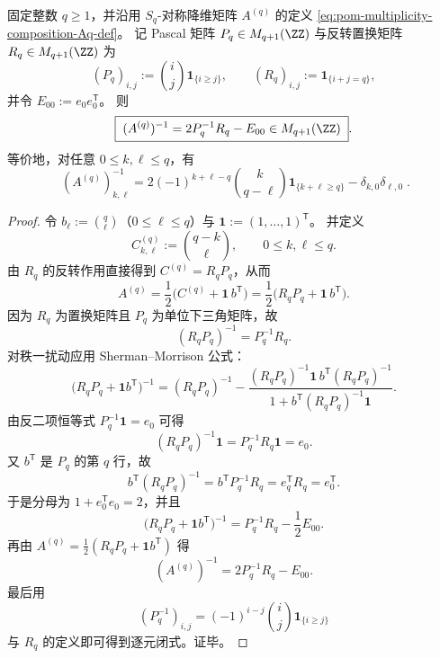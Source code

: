 \begin{conclusion}\label{con:xi-terminal-replica-softcore-Aq-explicit-inverse-integrality}
固定整数 \(q\ge 1\)，并沿用 \(S_q\)-对称降维矩阵 \(A^{(q)}\) 的定义 \eqref{eq:pom-multiplicity-composition-Aq-def}。
记 Pascal 矩阵 \(P_q\in M_{q+1}(\ZZ)\) 与反转置换矩阵 \(R_q\in M_{q+1}(\ZZ)\) 为
\[
(P_q)_{i,j}:=\binom{i}{j}\mathbf 1_{\{i\ge j\}},
\qquad
(R_q)_{i,j}:=\mathbf 1_{\{i+j=q\}},
\]
并令 \(E_{00}:=e_0e_0^{\mathsf T}\)。
则
\[
\boxed{\;
(A^{(q)})^{-1}=2P_q^{-1}R_q-E_{00}\in M_{q+1}(\ZZ)\; }.
\]
等价地，对任意 \(0\le k,\ell\le q\)，有
\[
\boxed{\;
(A^{(q)})^{-1}_{k,\ell}
=2(-1)^{k+\ell-q}\binom{k}{q-\ell}\mathbf 1_{\{k+\ell\ge q\}}
-\delta_{k,0}\delta_{\ell,0}\; } .
\]
\end{conclusion}
\begin{proof}
令 \(b_\ell:=\binom{q}{\ell}\)（\(0\le \ell\le q\)）与 \(\mathbf 1:=(1,\dots,1)^{\mathsf T}\)。
并定义
\[
C^{(q)}_{k,\ell}:=\binom{q-k}{\ell},
\qquad
0\le k,\ell\le q.
\]
由 \(R_q\) 的反转作用直接得到 \(C^{(q)}=R_qP_q\)，从而
\[
A^{(q)}=\frac12\bigl(C^{(q)}+\mathbf 1\,b^{\mathsf T}\bigr)
=\frac12\bigl(R_qP_q+\mathbf 1\,b^{\mathsf T}\bigr).
\]
因为 \(R_q\) 为置换矩阵且 \(P_q\) 为单位下三角矩阵，故
\[
(R_qP_q)^{-1}=P_q^{-1}R_q.
\]
对秩一扰动应用 Sherman--Morrison 公式：
\[
\bigl(R_qP_q+\mathbf 1b^{\mathsf T}\bigr)^{-1}
=(R_qP_q)^{-1}
-\frac{(R_qP_q)^{-1}\mathbf 1\,b^{\mathsf T}(R_qP_q)^{-1}}
{1+b^{\mathsf T}(R_qP_q)^{-1}\mathbf 1}.
\]
由反二项恒等式 \(P_q^{-1}\mathbf 1=e_0\) 可得
\[
(R_qP_q)^{-1}\mathbf 1=P_q^{-1}R_q\mathbf 1=e_0.
\]
又 \(b^{\mathsf T}\) 是 \(P_q\) 的第 \(q\) 行，故
\[
b^{\mathsf T}(R_qP_q)^{-1}
=b^{\mathsf T}P_q^{-1}R_q
=e_q^{\mathsf T}R_q
=e_0^{\mathsf T}.
\]
于是分母为 \(1+e_0^{\mathsf T}e_0=2\)，并且
\[
\bigl(R_qP_q+\mathbf 1b^{\mathsf T}\bigr)^{-1}
=P_q^{-1}R_q-\frac12E_{00}.
\]
再由 \(A^{(q)}=\frac12(R_qP_q+\mathbf 1b^{\mathsf T})\) 得
\[
(A^{(q)})^{-1}=2P_q^{-1}R_q-E_{00}.
\]
最后用
\[
(P_q^{-1})_{i,j}=(-1)^{i-j}\binom{i}{j}\mathbf 1_{\{i\ge j\}}
\]
与 \(R_q\) 的定义即可得到逐元闭式。证毕。
\end{proof}


